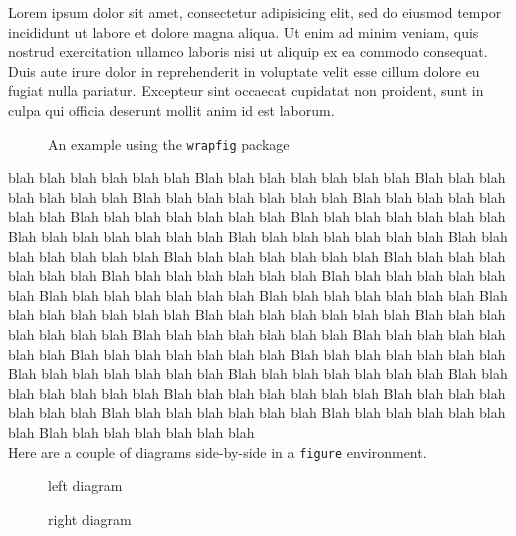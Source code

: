 \documentclass[a4paper,12pt]{article}
\begin{document}
\noindent Lorem ipsum dolor sit amet, consectetur adipisicing elit, sed do eiusmod tempor incididunt ut labore et dolore magna aliqua. Ut enim ad minim veniam, quis nostrud exercitation ullamco laboris nisi ut aliquip ex ea commodo consequat. Duis aute irure dolor in reprehenderit in voluptate velit esse cillum dolore eu fugiat nulla pariatur. Excepteur sint occaecat cupidatat non proident, sunt in culpa qui officia deserunt mollit anim id est laborum.
\begin{wrapfigure}{r}{152pt}
\begin{othelloboard}{0.75}
\dotmarkings
{}
\end{othelloboard}
\caption{An example using the \texttt{wrapfig} package}
\end{wrapfigure}
blah blah blah blah blah blah Blah blah blah blah blah blah blah Blah blah blah blah blah blah blah Blah blah blah blah blah blah blah Blah blah blah blah blah blah blah Blah blah blah blah blah blah blah Blah blah blah blah blah blah blah Blah blah blah blah blah blah blah Blah blah blah blah blah blah blah Blah blah blah blah blah blah blah Blah blah blah blah blah blah blah Blah blah blah blah blah blah blah Blah blah blah blah blah blah blah Blah blah blah blah blah blah blah Blah blah blah blah blah blah blah Blah blah blah blah blah blah blah Blah blah blah blah blah blah blah  Blah blah blah blah blah blah blah Blah blah blah blah blah blah blah Blah blah blah blah blah blah blah  Blah blah blah blah blah blah blah Blah blah blah blah blah blah blah Blah blah blah blah blah blah blah  Blah blah blah blah blah blah blah Blah blah blah blah blah blah blah Blah blah blah blah blah blah blah  Blah blah blah blah blah blah blah Blah blah blah blah blah blah blah Blah blah blah blah blah blah blah  Blah blah blah blah blah blah blah Blah blah blah blah blah blah blah\\

\noindent Here are a couple of diagrams side-by-side in a \verb=figure= environment.\\

\begin{figure}[ht]
\begin{minipage}[b]{0.5\linewidth}
\centering
\begin{othelloboard}{1}
\dotmarkings
{}
\end{othelloboard}
\caption{left diagram}
\end{minipage}
\hspace{0.5cm}
\begin{minipage}[b]{0.5\linewidth}
\centering
\begin{othelloboard}{1}
\dotmarkings
{}
\end{othelloboard}
\caption{right diagram}
\end{minipage}
\end{figure}
\end{document}
